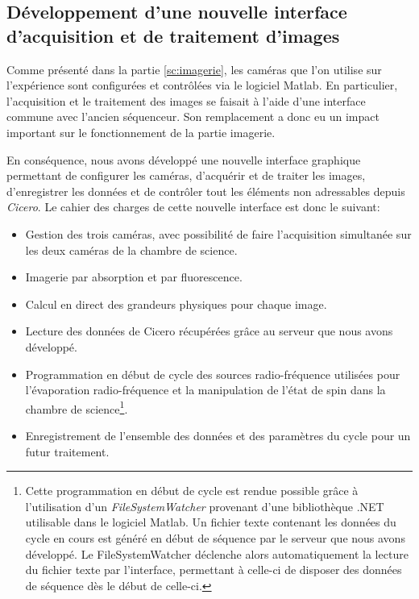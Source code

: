 \subsection{Développement d'une nouvelle interface d'acquisition et de traitement d'images}
Comme présenté dans la partie \ref{sc:imagerie}, les caméras que l'on utilise sur l'expérience sont configurées et contrôlées via le logiciel Matlab. En particulier, l'acquisition et le traitement des images se faisait à l'aide d'une interface commune avec l'ancien séquenceur. Son remplacement a donc eu un impact important sur le fonctionnement de la partie imagerie. 

En conséquence, nous avons développé une nouvelle interface graphique permettant de configurer les caméras, d'acquérir et de traiter les images, d'enregistrer les données et de contrôler tout les éléments non adressables depuis \emph{Cicero}. Le cahier des charges de cette nouvelle interface est donc le suivant:
\begin{itemize}
\item[\textendash] Gestion des trois caméras, avec possibilité de faire l'acquisition simultanée sur les deux caméras de la chambre de science.%
\item[\textendash] Imagerie par absorption et par fluorescence.
\item[\textendash] Calcul en direct des grandeurs physiques pour chaque image.
\item[\textendash] Lecture des données de Cicero récupérées grâce au serveur que nous avons développé.
\item[\textendash] Programmation en début de cycle des sources radio-fréquence utilisées pour l'évaporation radio-fréquence et la manipulation de l'état de spin dans la chambre de science\footnote{Cette programmation en début de cycle est rendue possible grâce à l'utilisation d'un \emph{FileSystemWatcher} provenant d'une bibliothèque .NET utilisable dans le logiciel Matlab. Un fichier texte contenant les données du cycle en cours est généré en début de séquence par le serveur que nous avons développé. Le FileSystemWatcher déclenche alors automatiquement la lecture du fichier texte par l'interface, permettant à celle-ci de disposer des données de séquence dès le début de celle-ci.}.
\item[\textendash] Enregistrement de l'ensemble des données et des paramètres du cycle pour un futur traitement.
\end{itemize}

